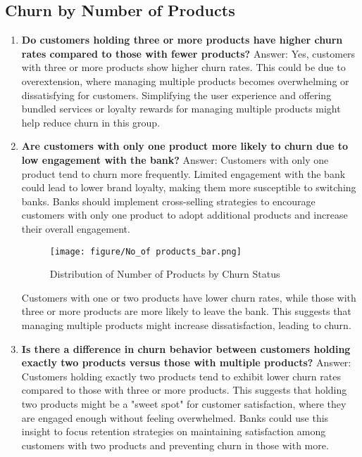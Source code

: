 \documentclass[12pt]{article}
\begin{document}
\subsection{Churn by Number of Products}
\begin{enumerate}
    \item \textbf{ Do customers holding three or more products have higher churn rates compared to those with fewer products?}
    Answer: Yes, customers with three or more products show higher churn rates. This could be due to overextension, where managing multiple products becomes overwhelming or dissatisfying for customers. Simplifying the user experience and offering bundled services or loyalty rewards for managing multiple products might help reduce churn in this group.

    \item \textbf{Are customers with only one product more likely to churn due to low engagement with the bank?}
    Answer: Customers with only one product tend to churn more frequently. Limited engagement with the bank could lead to lower brand loyalty, making them more susceptible to switching banks. Banks should implement cross-selling strategies to encourage customers with only one product to adopt additional products and increase their overall engagement.
       
    \begin{figure}[h]
        \vspace{25pt}
        \centering
        \texttt{[image: figure/No\_of products\_bar.png]}  
        \caption{Distribution of Number of Products by Churn Status}
            \label{fig:exampless}
       \vspace{0.1cm}
    \end{figure}

    Customers with one or two products have lower churn rates, while those with three or more products are more likely to leave the bank. This suggests that managing multiple products might increase dissatisfaction, leading to churn.
\newpage
    \item \textbf{Is there a difference in churn behavior between customers holding exactly two products versus those with multiple products?}
    Answer: Customers holding exactly two products tend to exhibit lower churn rates compared to those with three or more products. This suggests that holding two products might be a "sweet spot" for customer satisfaction, where they are engaged enough without feeling overwhelmed. Banks could use this insight to focus retention strategies on maintaining satisfaction among customers with two products and preventing churn in those with more.


\end{enumerate}
\end{document}
